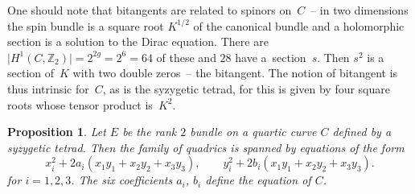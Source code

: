 \documentclass[10pt,a4paper]{amsart}
\numberwithin{equation}{section}
\newtheorem{Proposition}[Theorem]{Proposition}
 { \theoremstyle{definition}
\newtheorem{Remark}[Theorem]{Remark} }
\begin{document}
 One should note that bitangents are related to spinors on~$C$~-- in two dimensions the spin bundle is a square root $K^{1/2}$ of the canonical bundle and a holomorphic section is a solution to the Dirac equation. There are $\big\vert H^1(C,{\mathbb Z}_2)\big\vert=2^{2g}=2^6=64$ of these and $28$ have a~section~$s$. Then $s^2$ is a section of~$K$ with two double zeros~-- the bitangent. The notion of bitangent is thus intrinsic for~$C$, as is the syzygetic tetrad, for this is given by four square roots whose tensor product is~$K^2$.


 \begin{Proposition}
Let $E$ be the rank $2$ bundle on a quartic curve $C$ defined by a syzygetic tetrad. Then the family of quadrics is spanned by equations of the form
\[
x_i^2+2a_i(x_1y_1+x_2y_2+x_3y_3), \qquad y_i^2+2b_i(x_1y_1+x_2y_2+x_3y_3).
\]
for $i=1,2,3$. The six coefficients $a_i$, $b_i$ define the equation of $C$.
\end{Proposition}
\end{document}
